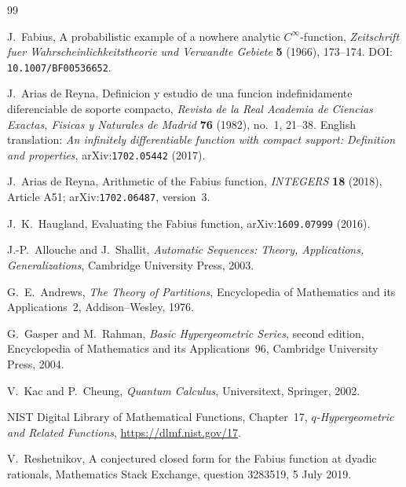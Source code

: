 \documentclass[11pt,oneside]{article}
\theoremstyle{definition}
\theoremstyle{remark}
\begin{document}
\renewcommand{\refname}{Topic references}
\begin{thebibliography}{99}

J.~Fabius,
\newblock A probabilistic example of a nowhere analytic $C^\infty$-function,
\newblock \emph{Zeitschrift fuer Wahrscheinlichkeitstheorie und Verwandte Gebiete}
  \textbf{5} (1966), 173--174.
\newblock DOI: \nolinkurl{10.1007/BF00536652}.

J.~Arias de Reyna,
\newblock Definicion y estudio de una funcion indefinidamente diferenciable de soporte
  compacto,
\newblock \emph{Revista de la Real Academia de Ciencias Exactas, Fisicas y Naturales de
  Madrid} \textbf{76} (1982), no.~1, 21--38.
\newblock English translation: \emph{An infinitely differentiable function with compact
  support: Definition and properties}, arXiv:\nolinkurl{1702.05442} (2017).

J.~Arias de Reyna,
\newblock Arithmetic of the Fabius function,
\newblock \emph{INTEGERS} \textbf{18} (2018), Article A51;
  arXiv:\nolinkurl{1702.06487}, version~3.

J.~K.~Haugland,
\newblock Evaluating the Fabius function,
\newblock arXiv:\nolinkurl{1609.07999} (2016).

J.-P.~Allouche and J.~Shallit,
\newblock \emph{Automatic Sequences: Theory, Applications, Generalizations},
\newblock Cambridge University Press, 2003.

G.~E.~Andrews,
\newblock \emph{The Theory of Partitions},
\newblock Encyclopedia of Mathematics and its Applications~2,
  Addison--Wesley, 1976.

G.~Gasper and M.~Rahman,
\newblock \emph{Basic Hypergeometric Series}, second edition,
\newblock Encyclopedia of Mathematics and its Applications~96,
  Cambridge University Press, 2004.

V.~Kac and P.~Cheung,
\newblock \emph{Quantum Calculus},
\newblock Universitext, Springer, 2002.

NIST Digital Library of Mathematical Functions, Chapter~17,
\newblock \emph{$q$-Hypergeometric and Related Functions},
\newblock \url{https://dlmf.nist.gov/17}.

V.~Reshetnikov,
\newblock A conjectured closed form for the Fabius function at dyadic rationals,
\newblock Mathematics Stack Exchange, question 3283519, 5 July 2019.


\end{thebibliography}
\end{document}

